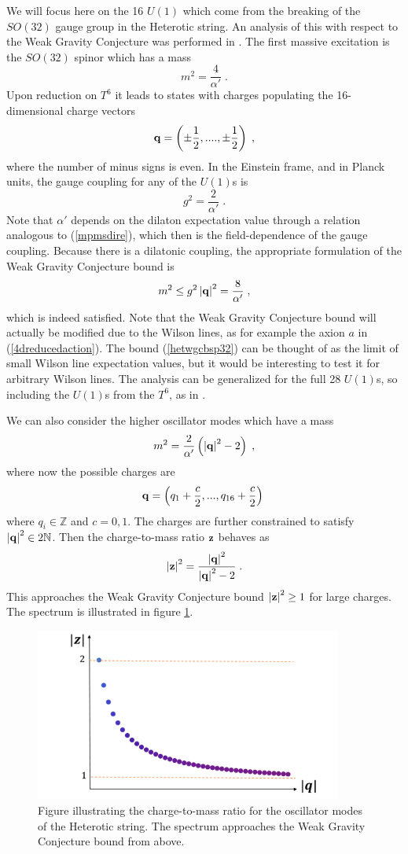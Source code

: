 \documentclass[11pt,a4paper]{article}
\numberwithin{equation}{section}
\numberwithin{table}{section}\setlength{\multlinegap}{25pt}
\newcommand{\be}{\begin{equation}}
\newcommand{\ee}{\end{equation}}
\begin{document}
We will focus here on the 16 $U(1)$ which come from the breaking of the $SO(32)$ gauge group in the Heterotic string. An analysis of this with respect to the Weak Gravity Conjecture was performed in \cite{Heidenreich:2015nta}. The first massive excitation is the $SO(32)$ spinor which has a mass
\be
m^2 = \frac{4}{\alpha'} \;.
\ee
Upon reduction on $T^6$ it leads to states with charges populating the 16-dimensional charge vectors
\be
{\bf q} = \left( \pm \frac12, ...., \pm \frac12 \right)\;,
\ee
where the number of minus signs is even. In the Einstein frame, and in Planck units, the gauge coupling for any of the $U(1)$s is 
\be
g^2 = \frac{2}{\alpha'} \;.
\ee
Note that $\alpha'$ depends on the dilaton expectation value through a relation analogous to (\ref{mpmsdire}), which then is the field-dependence of the gauge coupling. Because there is a dilatonic coupling, the appropriate formulation of the Weak Gravity Conjecture bound is \cite{Heidenreich:2015nta}
\be
\label{hetwgcbsp32}
m^2 \leq g^2 \left|{\bf q}\right|^2 = \frac{8}{\alpha'} \;,
\ee
which is indeed satisfied. Note that the Weak Gravity Conjecture bound will actually be modified due to the Wilson lines, as for example the axion $a$ in (\ref{4dreducedaction}). The bound (\ref{hetwgcbsp32}) can be thought of as the limit of small Wilson line expectation values, but it would be interesting to test it for arbitrary Wilson lines. The analysis can be generalized for the full 28 $U(1)$s, so including the $U(1)$s from the $T^6$, as in \cite{ArkaniHamed:2006dz}. 

We can also consider the higher oscillator modes which have a mass
\be
m^2 = \frac{2}{\alpha'} \left( \left|{\bf q}\right|^2 - 2\right) \;,
\ee
where now the possible charges are
\be
{\bf q} = \left(q_1 + \frac{c}{2},...,q_{16}  + \frac{c}{2} \right) \;
\ee
where $q_i \in \mathbb{Z}$ and $c=0,1$. The charges are further constrained to satisfy $ \left|{\bf q}\right|^2 \in 2 \mathbb{N}$. Then the charge-to-mass ratio ${\bf z}$ behaves as
\be
\left|{\bf z}\right|^2 = \frac{\left|{\bf q}\right|^2}{\left|{\bf q}\right|^2-2} \;.
\ee
This approaches the Weak Gravity Conjecture bound $\left|{\bf z}\right|^2 \geq 1$ for large charges. The spectrum is illustrated in figure \ref{fig:cmrhet}. 
\begin{figure}[t]
\centering
 \includegraphics[width=0.9\textwidth]{hetspec.pdf}
\caption{Figure illustrating the charge-to-mass ratio for the oscillator modes of the Heterotic string. The spectrum approaches the Weak Gravity Conjecture bound from above.}
\label{fig:cmrhet}
\end{figure}
\end{document}
